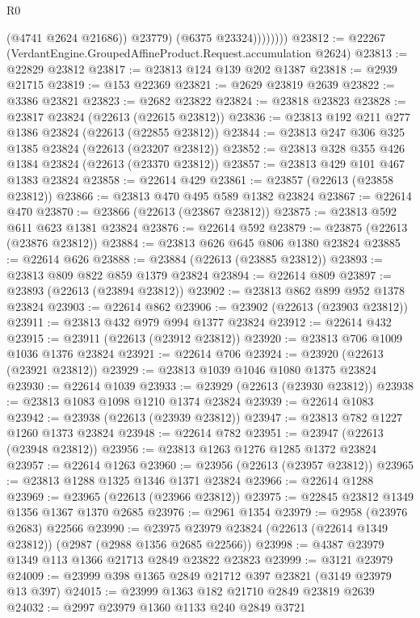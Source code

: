 \begin{lexlean}{R0}
\begin{coremodule}
                      (@4741 @2624 @21686))
                    @23779)
                  (@6375 @23324))))))))
@23812 := @22267 (VerdantEngine.GroupedAffineProduct.Request.accumulation @2624)
@23813 := @22829 @23812
@23817 := @23813 @124 @139 @202 @1387
@23818 := @2939 @21715
@23819 := @153 @22369
@23821 := @2629 @23819 @2639
@23822 := @3386 @23821
@23823 := @2682 @23822
@23824 := @23818 @23823
@23828 := @23817 @23824 (@22613 (@22615 @23812))
@23836 := @23813 @192 @211 @277 @1386 @23824 (@22613 (@22855 @23812))
@23844 := @23813 @247 @306 @325 @1385 @23824 (@22613 (@23207 @23812))
@23852 := @23813 @328 @355 @426 @1384 @23824 (@22613 (@23370 @23812))
@23857 := @23813 @429 @101 @467 @1383 @23824
@23858 := @22614 @429
@23861 := @23857 (@22613 (@23858 @23812))
@23866 := @23813 @470 @495 @589 @1382 @23824
@23867 := @22614 @470
@23870 := @23866 (@22613 (@23867 @23812))
@23875 := @23813 @592 @611 @623 @1381 @23824
@23876 := @22614 @592
@23879 := @23875 (@22613 (@23876 @23812))
@23884 := @23813 @626 @645 @806 @1380 @23824
@23885 := @22614 @626
@23888 := @23884 (@22613 (@23885 @23812))
@23893 := @23813 @809 @822 @859 @1379 @23824
@23894 := @22614 @809
@23897 := @23893 (@22613 (@23894 @23812))
@23902 := @23813 @862 @899 @952 @1378 @23824
@23903 := @22614 @862
@23906 := @23902 (@22613 (@23903 @23812))
@23911 := @23813 @432 @979 @994 @1377 @23824
@23912 := @22614 @432
@23915 := @23911 (@22613 (@23912 @23812))
@23920 := @23813 @706 @1009 @1036 @1376 @23824
@23921 := @22614 @706
@23924 := @23920 (@22613 (@23921 @23812))
@23929 := @23813 @1039 @1046 @1080 @1375 @23824
@23930 := @22614 @1039
@23933 := @23929 (@22613 (@23930 @23812))
@23938 := @23813 @1083 @1098 @1210 @1374 @23824
@23939 := @22614 @1083
@23942 := @23938 (@22613 (@23939 @23812))
@23947 := @23813 @782 @1227 @1260 @1373 @23824
@23948 := @22614 @782
@23951 := @23947 (@22613 (@23948 @23812))
@23956 := @23813 @1263 @1276 @1285 @1372 @23824
@23957 := @22614 @1263
@23960 := @23956 (@22613 (@23957 @23812))
@23965 := @23813 @1288 @1325 @1346 @1371 @23824
@23966 := @22614 @1288
@23969 := @23965 (@22613 (@23966 @23812))
@23975 := @22845 @23812 @1349 @1356 @1367 @1370 @2685
@23976 := @2961 @1354
@23979 := @2958 (@23976 @2683) @22566
@23990 := @23975 @23979 @23824 (@22613 (@22614 @1349 @23812)) (@2987 (@2988 @1356 @2685 @22566))
@23998 := @4387 @23979 @1349 @113 @1366 @21713 @2849 @23822 @23823
@23999 := @3121 @23979
@24009 := @23999 @398 @1365 @2849 @21712 @397 @23821 (@3149 @23979 @13 @397)
@24015 := @23999 @1363 @182 @21710 @2849 @23819 @2639
@24032 := @2997
    @23979
    @1360
    @1133
    @240
    @2849
    @3721

\end{coremodule}
\end{lexlean}
